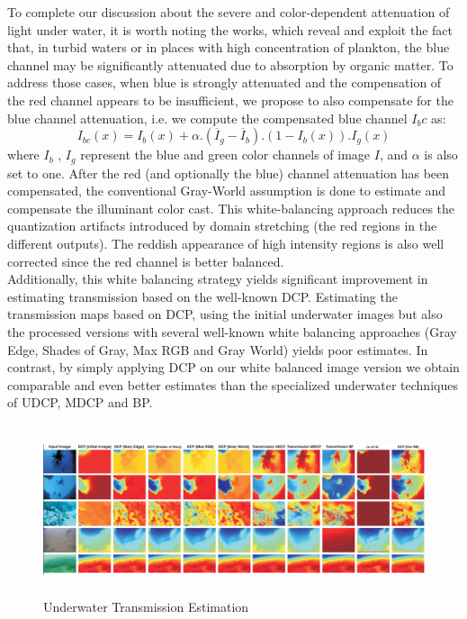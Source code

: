 \documentclass[hidelinks, 12pt]{report}
\begin{document}
To complete our discussion about the severe and color-dependent attenuation of light under water, it is worth noting the works, which reveal and exploit the fact that, in turbid waters or in places with high concentration of plankton, the blue channel may be significantly attenuated due to absorption by organic matter. To address those cases, when blue is strongly attenuated and the compensation of the red channel appears to be insufficient, we propose to also compensate for the blue channel attenuation, i.e. we compute the compensated blue channel $I_bc$ as:
\begin{equation}
I_{bc}(x)=I_b(x)+\alpha.(\overline{I}_g-\overline{I}_b).(1-I_b(x)).I_g(x)
\end{equation}
where $I_b$ , $I_g$ represent the blue and green color channels of image $I$, and $\alpha$ is also set to one. After the red (and optionally the blue) channel attenuation has been compensated, the conventional Gray-World assumption is done to estimate and compensate the illuminant color cast. This white-balancing approach reduces the quantization artifacts introduced by domain stretching (the red regions in the different outputs). The reddish appearance of high intensity regions is also well corrected since the red channel is better balanced.\\
Additionally, this white balancing strategy yields significant improvement in estimating transmission based on the well-known DCP. Estimating the transmission maps based on DCP, using the initial underwater images but also the processed versions with several well-known white balancing approaches (Gray Edge, Shades of Gray, Max RGB and Gray World) yields poor estimates. In contrast, by simply applying DCP on our white balanced
image version we obtain comparable and even better estimates than the specialized underwater techniques of UDCP, MDCP and BP.
\begin{figure}[H]
\centering
\includegraphics[width=15cm,height=5cm]{transmission.png}
\caption[Underwater Transmission Estimation]{Underwater Transmission Estimation}
\label{Underwater Transmission Estimation}
\end{figure}
\end{document}
